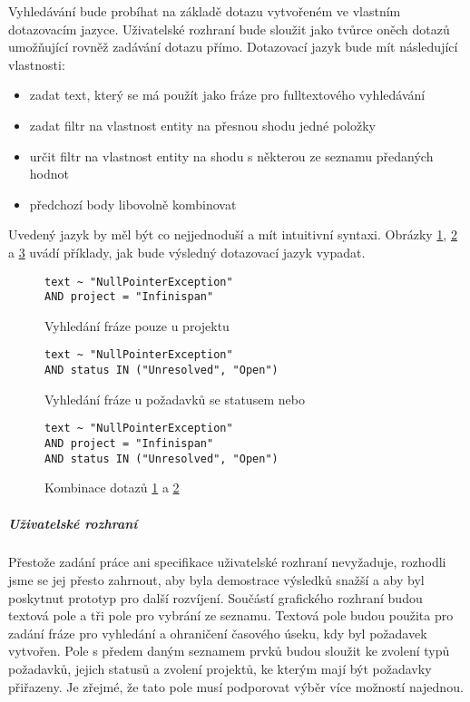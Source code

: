 \documentclass[11pt,oneside]{fithesis2}
\begin{document}
Vyhledávání bude probíhat na základě dotazu vytvořeném ve vlastním dotazovacím jazyce. Uživatelské rozhraní bude sloužit jako tvůrce oněch dotazů umožňující rovněž zadávání dotazu přímo. Dotazovací jazyk bude mít následující vlastnosti:
\begin{itemize}
	\item zadat text, který se má použít jako fráze pro fulltextového vyhledávání
	\item zadat filtr na vlastnost entity na přesnou shodu jedné položky
	\item určit filtr na vlastnost entity na shodu s některou ze seznamu předaných hodnot
	\item předchozí body libovolně kombinovat
\end{itemize}

Uvedený jazyk by měl být co nejjednoduší a mít intuitivní syntaxi. Obrázky \ref{QueryLanguageExample1}, \ref{QueryLanguageExample2} a \ref{QueryLanguageExample3} uvádí příklady, jak bude výsledný dotazovací jazyk vypadat.

\begin{figure}[htbp]
\begin{lstlisting}[frame=single]
text ~ "NullPointerException"
AND project = "Infinispan"
\end{lstlisting}
\caption{Vyhledání fráze  pouze u projektu }
\label{QueryLanguageExample1}
\end{figure}

\begin{figure}[htbp]
\begin{lstlisting}[frame=single]
text ~ "NullPointerException" 
AND status IN ("Unresolved", "Open")
\end{lstlisting}
\caption{Vyhledání fráze  u požadavků se statusem  nebo }
\label{QueryLanguageExample2}
\end{figure}

\begin{figure}[htbp]
\begin{lstlisting}[frame=single]
text ~ "NullPointerException" 
AND project = "Infinispan" 
AND status IN ("Unresolved", "Open")
\end{lstlisting}
\caption{Kombinace dotazů \ref{QueryLanguageExample1} a \ref{QueryLanguageExample2}}
\label{QueryLanguageExample3}
\end{figure}

\subparagraph{Uživatelské rozhraní}
Přestože zadání práce ani specifikace uživatelské rozhraní nevyžaduje, rozhodli jsme se jej přesto zahrnout, aby byla demostrace výsledků snažší a aby byl poskytnut prototyp pro další rozvíjení. Součástí grafického rozhraní budou textová pole a tři pole pro vybrání ze seznamu. Textová pole budou použita pro zadání fráze pro vyhledání a ohraničení časového úseku, kdy byl požadavek vytvořen. Pole s předem daným seznamem prvků budou sloužit ke zvolení typů požadavků, jejich statusů a zvolení projektů, ke kterým mají být požadavky přiřazeny. Je zřejmé, že tato pole musí podporovat výběr více možností najednou.
\end{document}
